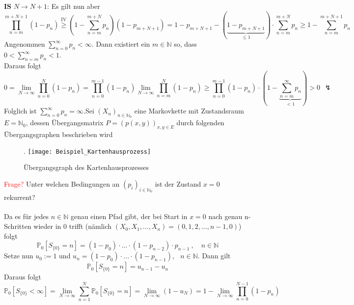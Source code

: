 \\
\\
\textbf{IS} $N \to N+1$: Es gilt nun aber
\begin{equation*}
\prod_{n=m}^{m+N+1} (1-p_{n}) \stackrel{\mathrm{IV}}{\geq} (1 - \sum_{n=m}^{m+N}p_{n})(1-p_{m+N+1}) = 1 - p_{m+N+1} - (\underbrace{1-p_{m+N+1}}_{\leq 1}) \cdot \sum_{n=m}^{m+N}p_{n} \geq 1 - \sum_{n=m}^{m+N+1} p_{n}
\end{equation*}
Angenommen $\sum_{n=0}^{\infty}p_{n} < \infty$. Dann existiert ein $m \in \mathbb{N}$ so, dass $0 < \sum_{n=m}^{\infty} p_{n} < 1$.
\\
Daraus folgt
\begin{equation*}
0 = \lim_{N \to \infty} \prod_{n=0}^{N} (1-p_{n}) = \prod_{n=0}^{m-1} (1-p_{n})  \lim_{N \to \infty} \prod_{n=m}^{N} (1-p_{n}) \geq \prod_{n=0}^{m-1} (1-p_{n}) \cdot (1 - \underbrace{\sum_{n=m}^{\infty} p_{n}}_{<1}) > 0 \: \: \lightning
\end{equation*}
Folglich ist $\sum_{n=0}^{\infty} p_{n} = \infty$.Sei $(X_{n})_{n \in \mathbb{N}_{0}}$ eine Markovkette mit Zustandsraum $E = \mathbb{N}_{0}$, dessen Übergangsmatrix $P = (p(x,y))_{x,y \in E}$ durch folgenden Übergangsgraphen beschrieben wird
\begin{figure}[H].
\centering
\texttt{[image: Beispiel\_Kartenhausprozess]}
\caption{Übergangsgraph des Kartenhausprozesses}
\end{figure}
\noindent
\textcolor{red}{Frage?} Unter welchen Bedingungen an $(p_{i})_{i \in \mathbb{N}_{0}}$ ist der Zustand $x=0$ rekurrent?
\\
\\
Da es für jedes $n \in \mathbb{N}$ genau einen Pfad gibt, der bei Start in $x=0$ nach genau n-Schritten wieder in 0 trifft (nämlich $(X_{0},X_{1},...,X_{n}) = (0,1,2,...,n-1,0)$) folgt
\begin{equation*}
\mathbb{P}_{0} [S_{\lbrace 0 \rbrace} = n] = (1-p_{0}) \cdot ... \cdot (1-p_{n-2}) \cdot p_{n-1} \: , \quad n \in \mathbb{N}
\end{equation*} 
Setze nun $u_{0} := 1$ und $u_{n} = (1-p_{0}) \cdot ... \cdot (1-p_{n-1})$, $\:$ $n \in \mathbb{N}$. Dann gilt
\begin{equation*}
\mathbb{P}_{0} [S_{\lbrace 0 \rbrace} = n] = u_{n-1} - u_{n}
\end{equation*}
Daraus folgt
\begin{equation*}
\mathbb{P}_{0} [S_{\lbrace 0 \rbrace} < \infty] = \lim_{N \to \infty} \sum_{n=1}^{N} \mathbb{P}_{0} [S_{\lbrace 0 \rbrace} = n] = \lim_{N \to \infty}(1-u_{N}) = 1 - \lim_{N \to \infty } \prod_{n=0}^{N-1}  (1 - p_{n})
\end{equation*}

